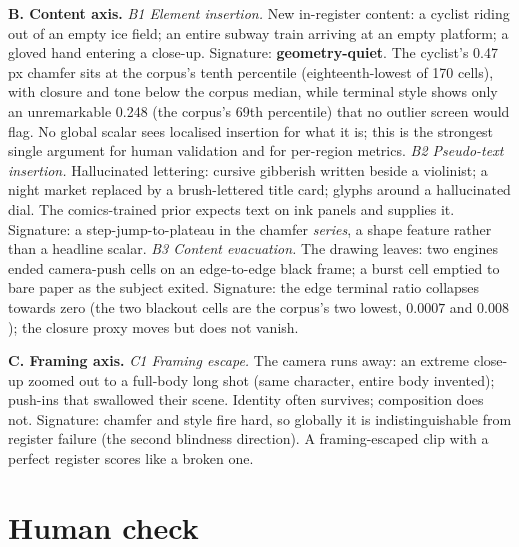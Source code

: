 \documentclass[11pt]{article}
\begin{document}
\textbf{B. Content axis.}
\emph{B1 Element insertion.} New in-register content: a cyclist riding
out of an empty ice field; an entire subway train arriving at an empty
platform; a gloved hand entering a close-up. Signature: \textbf{geometry-quiet}.
The cyclist's 0.47\,px chamfer sits at the corpus's tenth percentile (eighteenth-lowest of 170 cells), with
closure and tone below the corpus median, while terminal style shows only
an unremarkable 0.248 (the corpus's 69th percentile) that no outlier screen would flag. No global scalar sees
localised insertion for what it is; this is the strongest single
argument for human validation and for per-region metrics.
\emph{B2 Pseudo-text insertion.} Hallucinated lettering: cursive
gibberish written beside a violinist; a night market replaced by a
brush-lettered title card; glyphs around a hallucinated dial. The
comics-trained prior expects text on ink panels and supplies it. Signature:
a step-jump-to-plateau in the chamfer \emph{series}, a shape feature rather than
a headline scalar.
\emph{B3 Content evacuation.} The drawing leaves: two engines ended
camera-push cells on an edge-to-edge black frame; a burst cell emptied to
bare paper as the subject exited. Signature: the edge terminal ratio collapses towards zero (the two blackout cells are the corpus's two lowest, $0.0007$ and $0.008$); the closure proxy moves but does not vanish.

\textbf{C. Framing axis.}
\emph{C1 Framing escape.} The camera runs away: an extreme close-up
zoomed out to a full-body long shot (same character, entire body invented);
push-ins that swallowed their scene. Identity often survives; composition
does not. Signature: chamfer and style fire hard, so globally it is
indistinguishable from register failure (the second blindness direction). A
framing-escaped clip with a perfect register scores like a broken one.

\section{Human check}
\label{sec:human}
\end{document}
